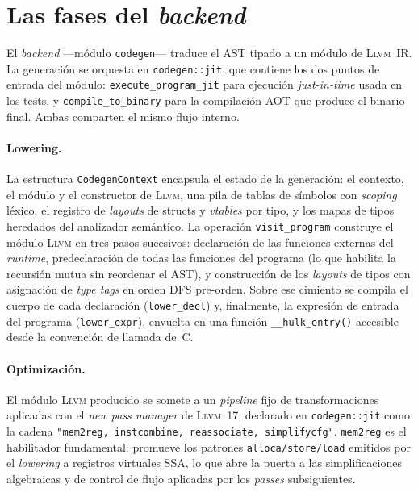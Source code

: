 \documentclass[11pt,a4paper,oneside,openany]{report}
\newcommand{\code}[1]{\texttt{#1}}
\newcommand{\llvm}{\textsc{Llvm}}
\begin{document}
\section{Las fases del \textit{backend}}

El \textit{backend} ---módulo \code{codegen}--- traduce el AST tipado a un
módulo de \llvm{}~IR. La generación se orquesta en \code{codegen::jit}, que
contiene los dos puntos de entrada del módulo:
\code{execute\_program\_jit} para ejecución \textit{just-in-time} usada en
los tests, y \code{compile\_to\_binary} para la compilación AOT que produce
el binario final. Ambas comparten el mismo flujo interno.

\paragraph{Lowering.} La estructura \code{CodegenContext} encapsula el estado
de la generación: el contexto, el módulo y el constructor de \llvm{}, una
pila de tablas de símbolos con \textit{scoping} léxico, el registro de
\textit{layouts} de structs y \textit{vtables} por tipo, y los mapas de
tipos heredados del analizador semántico. La operación \code{visit\_program}
construye el módulo \llvm{} en tres pasos sucesivos: declaración de las
funciones externas del \textit{runtime}, predeclaración de todas las
funciones del programa (lo que habilita la recursión mutua sin reordenar el
AST), y construcción de los \textit{layouts} de tipos con asignación de
\textit{type tags} en orden DFS pre-orden. Sobre ese cimiento se compila el
cuerpo de cada declaración (\code{lower\_decl}) y, finalmente, la expresión
de entrada del programa (\code{lower\_expr}), envuelta en una función
\code{\_\_hulk\_entry()} accesible desde la convención de llamada de~C.

\paragraph{Optimización.} El módulo \llvm{} producido se somete a un
\textit{pipeline} fijo de transformaciones aplicadas con el \textit{new pass
manager} de \llvm{}~17, declarado en \code{codegen::jit} como la cadena
\code{"mem2reg, instcombine, reassociate, simplifycfg"}. \code{mem2reg}
es el habilitador fundamental: promueve los patrones \code{alloca/store/load}
emitidos por el \textit{lowering} a registros virtuales SSA, lo que abre la
puerta a las simplificaciones algebraicas y de control de flujo aplicadas
por los \textit{passes} subsiguientes.
\end{document}
